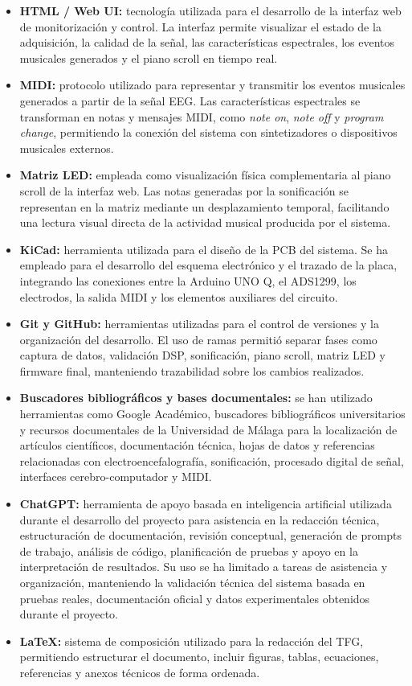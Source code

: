 \documentclass[../main.tex]{subfiles}
\begin{document}
\begin{itemize}
    \item \textbf{HTML / Web UI:} tecnología utilizada para el desarrollo de la interfaz web de monitorización y control. La interfaz permite visualizar el estado de la adquisición, la calidad de la señal, las características espectrales, los eventos musicales generados y el piano scroll en tiempo real.

    \item \textbf{MIDI:} protocolo utilizado para representar y transmitir los eventos musicales generados a partir de la señal EEG. Las características espectrales se transforman en notas y mensajes MIDI, como \textit{note on}, \textit{note off} y \textit{program change}, permitiendo la conexión del sistema con sintetizadores o dispositivos musicales externos.

    \item \textbf{Matriz LED:} empleada como visualización física complementaria al piano scroll de la interfaz web. Las notas generadas por la sonificación se representan en la matriz mediante un desplazamiento temporal, facilitando una lectura visual directa de la actividad musical producida por el sistema.

    \item \textbf{KiCad:} herramienta utilizada para el diseño de la PCB del sistema. Se ha empleado para el desarrollo del esquema electrónico y el trazado de la placa, integrando las conexiones entre la Arduino UNO Q, el ADS1299, los electrodos, la salida MIDI y los elementos auxiliares del circuito.

    \item \textbf{Git y GitHub:} herramientas utilizadas para el control de versiones y la organización del desarrollo. El uso de ramas permitió separar fases como captura de datos, validación DSP, sonificación, piano scroll, matriz LED y firmware final, manteniendo trazabilidad sobre los cambios realizados.

    \item \textbf{Buscadores bibliográficos y bases documentales:} se han utilizado herramientas como Google Académico, buscadores bibliográficos universitarios y recursos documentales de la Universidad de Málaga para la localización de artículos científicos, documentación técnica, hojas de datos y referencias relacionadas con electroencefalografía, sonificación, procesado digital de señal, interfaces cerebro-computador y MIDI.

    \item \textbf{ChatGPT:} herramienta de apoyo basada en inteligencia artificial utilizada durante el desarrollo del proyecto para asistencia en la redacción técnica, estructuración de documentación, revisión conceptual, generación de prompts de trabajo, análisis de código, planificación de pruebas y apoyo en la interpretación de resultados. Su uso se ha limitado a tareas de asistencia y organización, manteniendo la validación técnica del sistema basada en pruebas reales, documentación oficial y datos experimentales obtenidos durante el proyecto.

    \item \textbf{LaTeX:} sistema de composición utilizado para la redacción del TFG, permitiendo estructurar el documento, incluir figuras, tablas, ecuaciones, referencias y anexos técnicos de forma ordenada.

\end{itemize}
\end{document}
